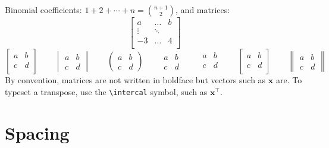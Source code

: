 \documentclass[11pt]{article}
\begin{document}
Binomial coefficients:
\({\displaystyle 1 + 2 + \cdots + n = \binom{n+1}{2}}\), and matrices:
\begin{equation*}
  \begin{bmatrix}
    a & \dots & b \\
    \vdots  & \ddots & \\
    -3 & \dots & 4     \\
  \end{bmatrix}
\end{equation*}
\begin{equation*}
  \begin{bmatrix}
    a & b \\
    c & d \\
  \end{bmatrix}
  \qquad
  \begin{vmatrix}
    a & b \\
    c & d
  \end{vmatrix}
  \qquad
  \begin{pmatrix}
    a & b \\
    c & d
  \end{pmatrix}
  \qquad
  \begin{matrix}
    a & b \\
    c & d
  \end{matrix}
  \qquad
  \begin{smallmatrix}
    a & b \\
    c & d \\
  \end{smallmatrix}
  \qquad
  \left[
  \begin{smallmatrix}
    a & b \\
    c & d \\
  \end{smallmatrix}
  \right]
  \qquad
  \begin{Vmatrix}
    a & b \\
    c & d
  \end{Vmatrix}
\end{equation*}
By convention, matrices are not written in boldface but vectors such as
\(\mathbf{x}\) are.  To typeset a transpose, use the \verb~\intercal~ symbol, such as
\(\mathbf{x}^\intercal\).

\section{Spacing}
\end{document}
